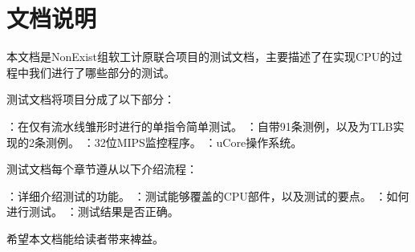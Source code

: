\chapter{文档说明}

本文档是NonExist组软工计原联合项目的测试文档，主要描述了在实现CPU的过程中我们进行了哪些部分的测试。

测试文档将项目分成了以下部分：

    \begin{enumerate}
        ：在仅有流水线雏形时进行的单指令简单测试。
        ：自带91条测例，以及为TLB实现的2条测例。
        ：32位MIPS监控程序。
        ：uCore操作系统。
    \end{enumerate}


测试文档每个章节遵从以下介绍流程：

    \begin{enumerate}
        ：详细介绍测试的功能。
        ：测试能够覆盖的CPU部件，以及测试的要点。
        ：如何进行测试。
        ：测试结果是否正确。
    \end{enumerate}

希望本文档能给读者带来裨益。
